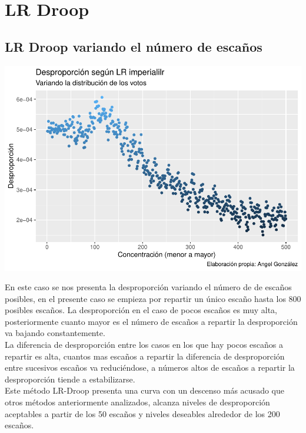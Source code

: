 \documentclass[12pt,a4paper,]{book}
\numberwithin{dummy}{section}
\theoremstyle{ocrenumbox}
\theoremstyle{blacknumex}
\theoremstyle{blacknumbox}
\theoremstyle{ocrenum}
\theoremstyle{ocrenum}
\begin{document}
\hypertarget{lr-droop}{%
\section{LR Droop}\label{lr-droop}}

\hypertarget{lr-droop-variando-el-nuxfamero-de-escauxf1os}{%
\subsection{LR Droop variando el número de
escaños}\label{lr-droop-variando-el-nuxfamero-de-escauxf1os}}

\begin{center}\includegraphics[width=0.95\linewidth]{figurasR/unnamed-chunk-53-1} \end{center}

En este caso se nos presenta la desproporción variando el número de de
escaños posibles, en el presente caso se empieza por repartir un único
escaño hasta los 800 posibles escaños. La desproporción en el caso de
pocos escaños es muy alta, posteriormente cuanto mayor es el número de
escaños a repartir la desproporción va bajando constantemente.\\
La diferencia de desproporción entre los casos en los que hay pocos
escaños a repartir es alta, cuantos mas escaños a repartir la diferencia
de desproporción entre sucesivos escaños va reduciéndose, a números
altos de escaños a repartir la desproporción tiende a estabilizarse.\\
Este método LR-Droop presenta una curva con un descenso más acusado que
otros métodos anteriormente analizados, alcanza niveles de desproporción
aceptables a partir de los 50 escaños y niveles deseables alrededor de
los 200 escaños.
\end{document}
